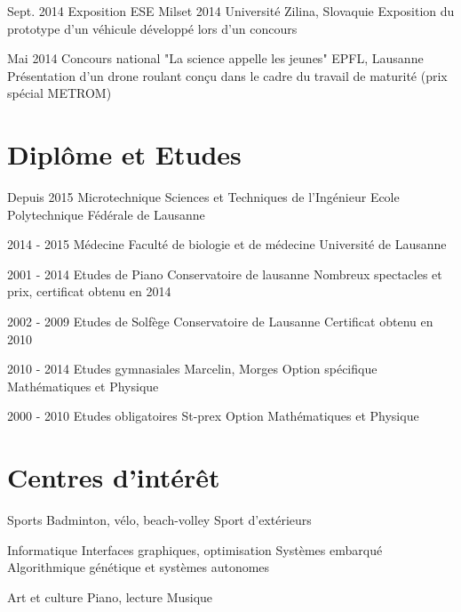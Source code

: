 \documentclass[]{friggeri-cv}
\begin{document}
	\begin{entrylist}
		
		\entry
		{Sept. 2014}
		{Exposition ESE Milset 2014}
		{Université Zilina, Slovaquie}
		{Exposition du prototype d'un véhicule développé lors d'un concours}
		
		\entry
		{Mai 2014}
		{Concours national "La science appelle les jeunes"}
		{EPFL, Lausanne}
		{Présentation d'un drone roulant conçu dans le cadre du travail de maturité (prix spécial METROM)}
	\end{entrylist}
	
	\section{Diplôme et Etudes}
	
	\begin{entrylist}
		
		\entry
		{Depuis 2015}
		{Microtechnique}
		{Sciences et Techniques de l'Ingénieur}
		{Ecole Polytechnique Fédérale de Lausanne}
		
		\entry
		{2014 - 2015}
		{Médecine}
		{Faculté de biologie et de médecine}
		{Université de Lausanne}
		
		\entry
		{2001 - 2014}
		{Etudes de Piano}
		{Conservatoire de lausanne}
		{Nombreux spectacles et prix, certificat obtenu en 2014}
		
		\entry
		{2002 - 2009}
		{Etudes de Solfège}
		{Conservatoire de Lausanne}
		{Certificat obtenu en 2010}
		
		\entry
		{2010 - 2014}
		{Etudes gymnasiales}
		{Marcelin, Morges}
		{Option spécifique Mathématiques et Physique}
		
		\entry
		{2000 - 2010}
		{Etudes obligatoires}
		{St-prex}
		{Option Mathématiques et Physique}
		
	\end{entrylist}
	
	\section{Centres d'intérêt}
	
	\begin{entrylist}
		
		\entry
		{Sports}
		{Badminton, vélo, beach-volley}
		{Sport d'extérieurs}
		{}
		
		\entry
		{Informatique}
		{Interfaces graphiques, optimisation}
		{Systèmes embarqué}
		{Algorithmique génétique et systèmes autonomes}
		
		\entry
		{Art et culture}
		{Piano, lecture}
		{Musique}
		{}
		
	\end{entrylist}
\end{document}
